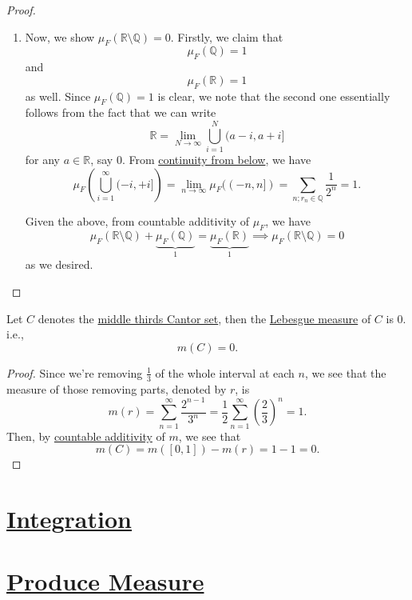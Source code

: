 \begin{proof}
\begin{enumerate}
		\item Now, we show \(\mu _{F}(\mathbb{R} \setminus \mathbb{Q} ) = 0\). Firstly, we claim that
		      \[
			      \mu _{F}(\mathbb{Q} ) = 1
		      \]
		      and
		      \[
			      \mu _{F}(\mathbb{R} ) = 1
		      \]
		      as well. Since \(\mu _{F}(\mathbb{Q} ) = 1\) is clear, we note that the second one essentially follows from the fact that we can write
		      \[
			      \mathbb{R} = \lim_{N \to \infty} \bigcup_{i=1}^{N} (a-i, a+i]
		      \]
		      for any \(a\in\mathbb{R} \), say \(0\). From \hyperref[thm:measure-space-continuity-from-below]{continuity from below}, we have
		      \[
			      \mu _{F}\left(\bigcup_{i=1}^{\infty} (-i, +i]\right) = \lim_{n \to \infty} \mu _{F}((-n, n]) = \sum_{n;r_{n}\in\mathbb{Q} }\frac{1}{2^n} = 1.
		      \]

		      \par Given the above, from countable additivity of \(\mu _{F}\), we have
		      \[
			      \mu _{F}(\mathbb{R} \setminus \mathbb{Q} ) + \underbrace{\mu _{F}(\mathbb{Q} )}_{1} = \underbrace{\mu _{F}(\mathbb{R} )}_{1} \implies \mu _{F}(\mathbb{R} \setminus \mathbb{Q} ) = 0
		      \]
		      as we desired.
	\end{enumerate}
\end{proof}

\begin{lemma}\label{lma:Cantor-set-has-measure-0}
	Let \(C\) denotes the \hyperref[eg:lec8:Cantor-set]{middle thirds Cantor set}, then the \hyperref[def:Lebesgue-measure]{Lebesgue measure} of \(C\) is \(0\). i.e.,
	\[
		m(C) = 0.
	\]
\end{lemma}
\begin{proof}
	Since we're removing \(\frac{1}{3}\) of the whole interval at each \(n\), we see that the measure of those removing parts, denoted by \(r\), is
	\[
		m(r) = \sum_{n=1}^{\infty} \frac{2^{n-1}}{3^n} = \frac{1}{2}\sum_{n=1}^{\infty} \left(\frac{2}{3}\right)^n = 1.
	\]
	Then, by \hyperref[def:measure]{countable additivity} of \(m\), we see that
	\[
		m(C) = m([0, 1]) - m(r) = 1 - 1 = 0.
	\]
\end{proof}

\section{\hyperref[ch:Integration]{Integration}}

\section{\hyperref[ch:Product-Measure]{Produce Measure}}


